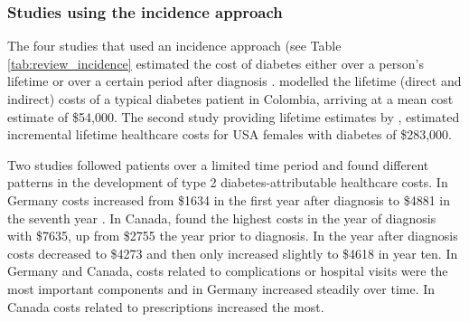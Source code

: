 \subsubsection{Studies using the incidence approach}
The four studies that used an incidence approach (see Table \ref{tab:review_incidence} estimated the cost of diabetes either over a person's lifetime \parencite{Gonzalez2009b,Birnbaum2003c} or over a certain period after diagnosis \textcite{Johnson2006d,Martin2007b}. \textcite{Gonzalez2009b} modelled the lifetime (direct and indirect) costs of a typical diabetes patient in Colombia, arriving at a mean cost estimate of \$54,000. The second study providing lifetime estimates by \textcite{Birnbaum2003c}, estimated incremental lifetime healthcare costs for USA females with diabetes of \$283,000.

Two studies followed patients over a limited time period and found different patterns in the development of type 2 diabetes-attributable healthcare costs. In Germany costs increased from  \$1634 in the first year after diagnosis to \$4881 in the seventh year \parencite{Martin2007b}. In Canada, \textcite{Johnson2006d} found the highest costs in the year of diagnosis with \$7635, up from \$2755 the year prior to diagnosis. In the year after diagnosis costs decreased to \$4273 and then only increased slightly to \$4618 in year ten. In Germany and Canada, costs related to complications or hospital visits were the most important components and in Germany increased steadily over time. In Canada costs related to prescriptions increased the most.

